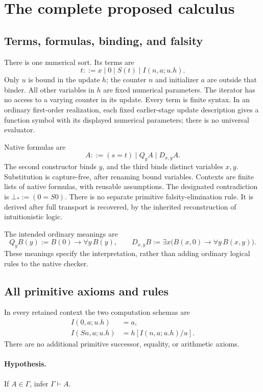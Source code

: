 \documentclass[11pt]{article}
\theoremstyle{definition}\newtheorem{definition}[theorem]{Definition}
\theoremstyle{remark}\newtheorem{remark}[theorem]{Remark}
\begin{document}
\section{The complete proposed calculus}
\label{sec:inventory}

\subsection{Terms, formulas, binding, and falsity}

There is one numerical sort. Its terms are
\[
 t::=x\mid0\mid S(t)\mid I(n,a;u.h).
\]
Only $u$ is bound in the update $h$; the counter $n$ and initializer $a$
are outside that binder. All other variables in $h$ are fixed numerical
parameters. The iterator has no access to a varying counter in its update.
Every term is finite syntax. In an ordinary first-order realization, each
fixed earlier-stage update description gives a function symbol with its
displayed numerical parameters; there is no universal evaluator.

Native formulas are
\[
 A::=(s=t)\mid Q_y A\mid D_{x,y}A.
\]
The second constructor binds $y$, and the third binds distinct variables
$x,y$. Substitution is capture-free, after renaming bound variables.
Contexts are finite lists of native formulas, with reusable assumptions.
The designated contradiction is $\bot_*:=(0=S0)$. There is no separate
primitive falsity-elimination rule. It is derived after full transport is
recovered, by the inherited reconstruction of intuitionistic logic.

The intended ordinary meanings are
\[
 Q_y B(y):=B(0)\to\forall y\,B(y),\qquad
 D_{x,y}B:=\exists x\bigl(B(x,0)\to\forall y\,B(x,y)\bigr).
\]
These meanings specify the interpretation, rather than adding ordinary
logical rules to the native checker.

\subsection{All primitive axioms and rules}

In every retained context the two computation schemas are
\begin{align*}
 I(0,a;u.h)&=a,\\
 I(Sn,a;u.h)&=h[I(n,a;u.h)/u].
\end{align*}
There are no additional primitive successor, equality, or arithmetic axioms.

\paragraph{Hypothesis.}
If $A\in\Gamma$, infer $\Gamma\vdash A$.
\end{document}
